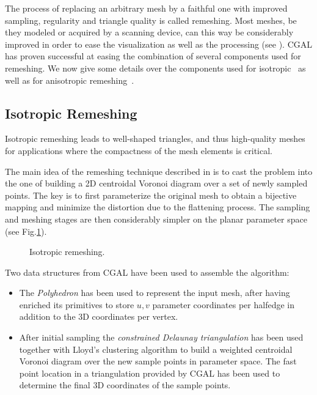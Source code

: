 \label{sec:remeshing}


The process of replacing an arbitrary mesh by a faithful one with
improved sampling, regularity and triangle quality is called
remeshing. Most meshes, be they modeled or acquired by a scanning
device, can this way be considerably improved in order to ease the
visualization as well as the processing (see \cite{ss-dgp-01}). CGAL
has proven successful at easing the combination of several components
used for remeshing. We now give some details over the components used
for isotropic~\cite{acdi-isr-03} as well as for anisotropic
remeshing~\cite{acdld-apr-03}.

\subsection{Isotropic Remeshing}


Isotropic remeshing leads to well-shaped triangles, and thus
high-quality meshes for applications where the compactness of the mesh
elements is critical.


The main idea of the remeshing technique described in
\cite{acdi-isr-03} is to cast the problem into the
one of building a 2D centroidal Voronoi diagram over a set of newly
sampled points. The key is to first parameterize the original mesh to
obtain a bijective mapping and minimize the distortion due to the
flattening process. The sampling and meshing stages are then
considerably simpler on the planar parameter space (see
Fig.\ref{fig:isotropic}).

\begin{figure}
  \centering
  \caption{Isotropic remeshing.}
  \label{fig:isotropic}
\end{figure}



Two data structures from CGAL have been used to assemble the
algorithm:

\begin{itemize}

\item 
The \emph{Polyhedron} has been used to represent the input mesh, after
having enriched its primitives to store $u,v$ parameter coordinates
per halfedge in addition to the 3D coordinates per vertex.

\item 
After initial sampling the \emph{constrained Delaunay triangulation}
has been used together with Lloyd's clustering algorithm to build a
weighted centroidal Voronoi diagram over the new sample points in
parameter space. The fast point location in a triangulation provided
by CGAL has been used to determine the final 3D coordinates of the
sample points.

\end{itemize}

